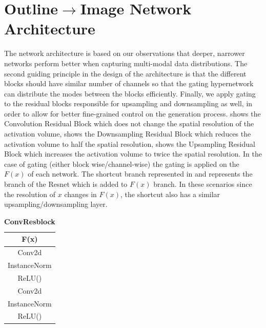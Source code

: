 \section{Outline$\rightarrow$Image Network Architecture}
The network architecture is based on our observations that deeper, narrower networks perform better when capturing multi-modal data distributions. 
The second guiding principle in the design of the architecture is that the different blocks should have similar number of channels so that the gating hypernetwork can distribute the modes between the blocks efficiently. 
Finally, we apply gating to the residual blocks responsible for upsampling and downsampling as well, in order to allow for better fine-grained control on the generation process. 
 shows the Convolution Residual Block which does not change the spatial resolution of the activation volume, 
 shows the Downsampling Residual Block which reduces the activation volume to half the spatial resolution, 
 shows the Upsampling Residual Block which increases the activation volume to twice the spatial resolution.
In the case of gating (either block wise/channel-wise) the gating is applied on the $F(x)$ of each network. 
The shortcut branch represented in  and  represents the branch of the Resnet which is added to $F(x)$ branch. In these scenarios since the resolution of $x$ changes in $F(x)$, the shortcut also has a similar upsampling/downsampling layer.


\begin{table}[ht]
    \makegapedcells
        \centering %
        \begin{tabular}{c} %
        \toprule
        \textbf{F(x)}\\%
        \midrule
        Conv2d \\
        InstanceNorm\\ %
        ReLU() \\
        Conv2d \\
        InstanceNorm\\ %
        ReLU() \\
        \bottomrule %
        \end{tabular}
        \caption{\textbf{ConvResblock}} %
        \label{table:convresblock} %
\end{table}

